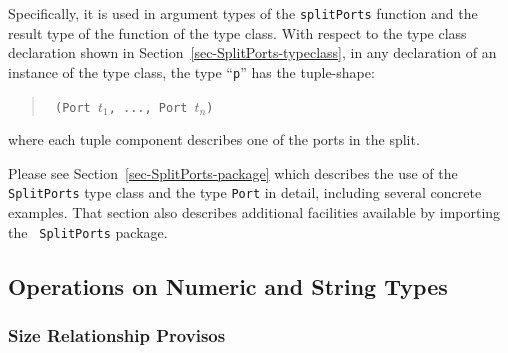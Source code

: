 Specifically, it is used in argument types of the {\tt splitPorts}
function and the result type of the  function of the
type class.  With respect to the  type class
declaration shown in Section~\ref{sec-SplitPorts-typeclass}, in any
declaration of an instance of the type class, the type ``{\tt p}'' has
the tuple-shape:

\begin{quote}\tt
(Port $t_1$, ..., Port $t_n$)
\end{quote}

where each tuple component describes one of the ports in the split.

Please see Section~\ref{sec-SplitPorts-package} which describes the
use of the {\tt SplitPorts} type class and the type {\tt Port} in
detail, including several concrete examples. That section also
describes additional facilities available by importing the {\tt
  SplitPorts} package.








\subsection{Operations on Numeric and String Types}

\subsubsection{Size Relationship Provisos}




